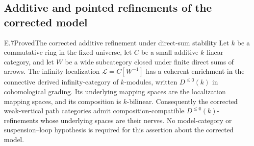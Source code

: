 \subsection{Additive and pointed refinements of the corrected model}
\begin{result}{E.7}{Proved}{The corrected additive refinement under direct-sum stability}
Let $k$ be a commutative ring in the fixed universe, let $C$ be a small additive $k$-linear category, and let $W$ be a wide subcategory closed under finite direct sums of arrows. The infinity-localization $\mathcal L=C[W^{-1}]$ has a coherent enrichment in the connective derived infinity-category of $k$-modules, written $D^{\leq0}(k)$ in cohomological grading. Its underlying mapping spaces are the localization mapping spaces, and its composition is $k$-bilinear. Consequently the corrected weak-vertical path categories admit composition-compatible $D^{\leq0}(k)$-refinements whose underlying spaces are their nerves. No model-category or suspension--loop hypothesis is required for this assertion about the corrected model.
\end{result}
